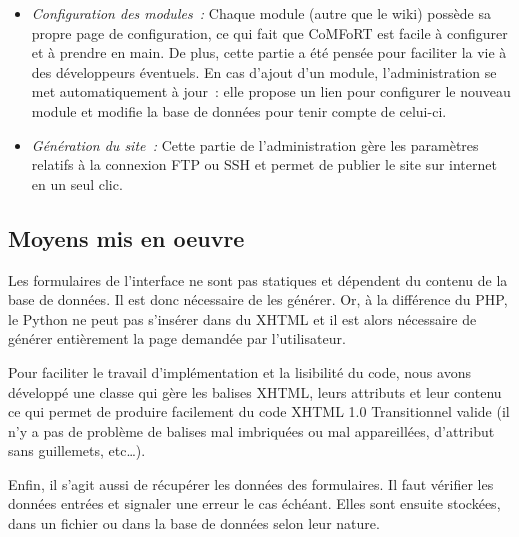 \documentclass[final,11pt,a4paper,twoside,titlepage]{article}
\newcommand{\p}{\vspace{0.3em}}
\begin{document}
{\begin{itemize}
        La gestion des pages consiste principalement à ajouter/supprimer des
        pages, à choisir les modules actifs sur telle ou telle page ainsi que
        leur ordre d'affichage et à modifier le contenu de la page via le wiki.
        \p
      
      \item \emph{Configuration des modules~:}
        Chaque module (autre que le wiki) possède sa propre page de 
        configuration, ce qui fait que CoMFoRT est facile à configurer et à
        prendre en main.
        De plus, cette partie a été pensée pour faciliter la vie à des
        développeurs éventuels. En cas d'ajout d'un module, l'administration se 
        met automatiquement à jour~: elle propose un lien pour configurer le 
        nouveau module et modifie la base de données pour tenir compte de
        celui-ci.\p
      
      \item \emph{Génération du site~:}
        Cette partie de l'administration gère les paramètres relatifs à la
        connexion FTP ou SSH et permet de publier le site sur internet en un
        seul clic.
      \end{itemize}
      
    \subsection{Moyens mis en oeuvre}
    Les formulaires de l'interface ne sont pas statiques et dépendent du contenu
    de la base de données. Il est donc nécessaire de les générer. Or, à la 
    différence du PHP, le Python ne peut pas s'insérer dans du XHTML et il est
    alors nécessaire de générer entièrement la page demandée par l'utilisateur.
    \p
    
    Pour faciliter le travail d'implémentation et la lisibilité du code, nous
    avons développé une classe qui gère les balises XHTML, leurs attributs et
    leur contenu ce qui permet de produire facilement du code XHTML 1.0 
    Transitionnel valide (il n'y a pas de problème de balises mal imbriquées ou
    mal appareillées, d'attribut sans guillemets, etc\ldots).\p
    
    Enfin, il s'agit aussi de récupérer les données des formulaires. Il faut
    vérifier les données entrées et signaler une erreur le cas échéant.
    Elles sont ensuite stockées, dans un fichier ou dans la base de données
    selon leur nature.\p
      
}
\end{document}
